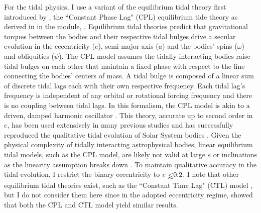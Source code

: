 For the tidal physics, I use a variant of the equilibrium tidal theory first introduced by \citet{Darwin1880}, the ``Constant Phase Lag" (CPL) equilibrium tide theory as derived in \citet{FerrazMello2008} in the module, \eqtide.  Equilibrium tidal theories predict that gravitational torques between the bodies and their respective tidal bulges drive a secular evolution in the eccentricity ($e$), semi-major axis ($a$) and the bodies' spins ($\omega$) and obliquities ($\psi$).  The CPL model assumes the tidally-interacting bodies raise tidal bulges on each other that maintain a fixed phase with respect to the line connecting the bodies' centers of mass.  A tidal bulge is composed of a linear sum of discrete tidal lags each with their own respective frequency.  Each tidal lag's frequency is independent of any orbital or rotational forcing frequency and there is no coupling between tidal lags.  In this formalism, the CPL model is akin to a driven, damped harmonic oscillator \citep{Greenberg2009}.  This theory, accurate up to second order in $e$, has been used extensively in many previous studies \citep[e.g.][]{Leconte2010,Heller2011,Barnes2013} and has successfully reproduced the qualitative tidal evolution of Solar System bodies \citep[e.g.][]{Goldreich1966}.  Given the physical complexity of tidally interacting astrophysical bodies, linear equilibrium tidal models, such as the CPL model, are likely not valid at large $e$ or inclinations as the linearity assumption breaks down \citep{FerrazMello2008,Greenberg2009}.  To maintain qualitative accuracy in the tidal evolution, I restrict the binary eccentricity to $e \lsim 0.2$.  I note that other equilibrium tidal theories exist, such as the ``Constant Time Lag" (CTL) model \citep[e.g.][]{Hut1981}, but I do not consider them here since in the adopted eccentricity regime, \citet{Leconte2010} showed that both the CPL and CTL model yield similar results.

